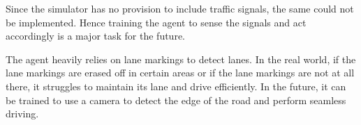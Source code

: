Since the simulator has no provision to include traffic signals, the same could not be implemented. Hence training the agent to sense the signals and act accordingly is a major task for the future. 

The agent heavily relies on lane markings to detect lanes. In the real world, if the lane markings are erased off in certain areas or if the lane markings are not at all there, it struggles to maintain its lane and drive efficiently. In the future, it can be trained to use a camera to detect the edge of the road and perform seamless driving. 




